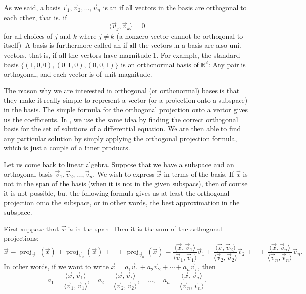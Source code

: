 As we said, a basis $\vec{v}_1,\vec{v}_2,\ldots,\vec{v}_n$
is an \emph{} if all vectors in the
basis are orthogonal to each other, that is, if
\begin{equation*}
\langle \vec{v}_j , \vec{v}_k \rangle = 0
\end{equation*}
for all choices of $j$ and $k$ where $j \not= k$ (a nonzero vector cannot be
orthogonal to itself).
A basis is furthermore called an \emph{} if all
the vectors in a basis are also unit vectors, that is, if all the vectors
have magnitude 1.
For example, the standard basis $\{ (1,0,0), (0,1,0), (0,0,1) \}$ is an
orthonormal basis of ${\mathbb{R}}^3$:
Any pair is orthogonal, and each vector is of unit
magnitude.

The reason why we are interested in orthogonal (or orthonormal) bases is
that they make it really simple to represent a vector (or a projection onto
a subspace) in the basis.  The simple formula for the orthogonal projection
onto a vector gives us the coefficients.  In 
, we use the same idea by finding the correct 
orthogonal basis for the set of solutions of a differential equation.
We are then able to find any particular solution by simply applying the
orthogonal projection formula, which is just a couple of a inner products.

Let us come back to linear algebra.  Suppose that we have a subspace
and an orthogonal
basis $\vec{v}_1, \vec{v}_2, \ldots, \vec{v}_n$.  We wish to
express $\vec{x}$ in terms of the basis.  If $\vec{x}$ is not in the span
of the basis (when it is not in the given subspace),
then of course it is not possible,
but the following formula
gives us at least the orthogonal projection onto the subspace,
or in other words, the best approximation in the subspace.

First suppose that $\vec{x}$ is in the span.  Then it is the sum of the
orthogonal projections:
\begin{equation*}
\vec{x} = 
\operatorname{proj}_{\vec{v}_1} ( \vec{x} )
+
\operatorname{proj}_{\vec{v}_2} ( \vec{x} )
+
\cdots
+
\operatorname{proj}_{\vec{v}_n} ( \vec{x} )
=
\frac{\langle \vec{x}, \vec{v}_1 \rangle}{
\langle \vec{v}_1, \vec{v}_1 \rangle
}
\vec{v}_1
+
\frac{\langle \vec{x}, \vec{v}_2 \rangle}{
\langle \vec{v}_2, \vec{v}_2 \rangle
}
\vec{v}_2
+
\cdots
+
\frac{\langle \vec{x}, \vec{v}_n \rangle}{
\langle \vec{v}_n, \vec{v}_n \rangle
}
\vec{v}_n .
\end{equation*}
In other words, if we want to write
$\vec{x} =
a_1 \vec{v}_1 + 
a_2 \vec{v}_2 + \cdots +
a_n \vec{v}_n$, then
\begin{equation*}
a_1 = 
\frac{\langle \vec{x}, \vec{v}_1 \rangle}{
\langle \vec{v}_1, \vec{v}_1 \rangle
} , \quad
a_2 = 
\frac{\langle \vec{x}, \vec{v}_2 \rangle}{
\langle \vec{v}_2, \vec{v}_2 \rangle
} , \quad \ldots , \quad
a_n = 
\frac{\langle \vec{x}, \vec{v}_n \rangle}{
\langle \vec{v}_n, \vec{v}_n \rangle
} .
\end{equation*}

